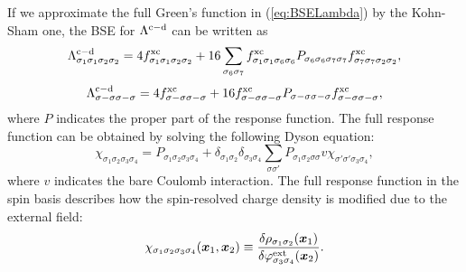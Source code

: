 %
%
%
If we approximate the full Green's function in (\ref{eq:BSELambda}) by the Kohn-Sham one, 
the BSE for $\Lambda^{\rm c - \rm d}$ can be written as
\begin{equation}
	\Lambda^{\rm c - \rm d}_{\sigma_1\sigma_1\sigma_2\sigma_2} = 4f^{\rm xc}_{\sigma_1\sigma_1\sigma_2\sigma_2} 
	+ 16 \sum_{\sigma_6\sigma_7}f^{\rm xc }_{\sigma_1\sigma_1\sigma_6\sigma_6}
	P_{\sigma_6\sigma_6\sigma_7\sigma_7}f^{\rm xc}_{\sigma_7\sigma_7\sigma_2\sigma_2},
	\label{eq:longlambda}
\end{equation}
%
\begin{equation}
	\Lambda^{\rm c - \rm d}_{\sigma-\sigma\sigma-\sigma} = 4f^{\rm xc}_{\sigma-\sigma\sigma-\sigma} 
	+ 16 f^{\rm xc }_{\sigma-\sigma\sigma-\sigma}
	P_{\sigma-\sigma\sigma-\sigma}f^{\rm xc}_{\sigma-\sigma\sigma-\sigma},
	\label{eq:translambda}
\end{equation}
%
where $P$ indicates the proper part of the response function. The full response function can be obtained
by solving the following Dyson equation:
%
\begin{equation}
	\chi_{\sigma_1\sigma_2\sigma_3\sigma_4} = P_{\sigma_1\sigma_2\sigma_3\sigma_4}
	+ \delta_{\sigma_1\sigma_2}\delta_{\sigma_3\sigma_4} \sum_{\sigma\sigma'}
	P_{\sigma_1\sigma_2\sigma\sigma}v\chi_{\sigma'\sigma'\sigma_3\sigma_4},
	\label{eq:chiDyson}
\end{equation}
%
where $v$ indicates the bare Coulomb interaction.
The full response function in the spin basis describes how the spin-resolved charge density is modified
due to the external field:
%
\begin{equation}
	\chi_{\sigma_1\sigma_2\sigma_3\sigma_4}(\bm x_1,\bm x_2) \equiv
	\frac{\delta\rho_{\sigma_1\sigma_2}(\bm x_1)}{\delta\varphi^{\rm ext}_{\sigma_3\sigma_4}(\bm x_2)}.
	\label{eq:spinchi}
\end{equation}
